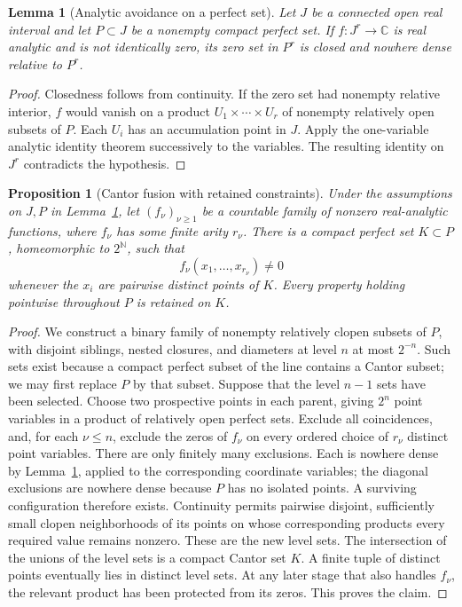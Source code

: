 \documentclass[11pt,a4paper]{article}
\newtheorem{lemma}[theorem]{Lemma}
\newtheorem{proposition}[theorem]{Proposition}
\theoremstyle{definition}
\theoremstyle{remark}
\numberwithin{equation}{section}
\begin{document}
\begin{lemma}[Analytic avoidance on a perfect set]
\label{fol:lem:analytic-avoidance}
Let $J$ be a connected open real interval and let $P\subset J$ be a
nonempty compact perfect set. If $f:J^r\to\mathbb C$ is real analytic
and is not identically zero, its zero set in $P^r$ is closed and nowhere
dense relative to $P^r$.
\end{lemma}
\begin{proof}
Closedness follows from continuity. If the zero set had nonempty
relative interior, $f$ would vanish on a product $U_1\times\cdots\times
U_r$ of nonempty relatively open subsets of $P$. Each $U_i$ has an
accumulation point in $J$. Apply the one-variable analytic identity
theorem successively to the variables. The resulting identity on
$J^r$ contradicts the hypothesis.
\end{proof}

\begin{proposition}[Cantor fusion with retained constraints]
\label{fol:prop:analytic-fusion}
Under the assumptions on $J,P$ in Lemma~\ref{fol:lem:analytic-avoidance},
let $(f_\nu)_{\nu\ge1}$ be a countable family of nonzero real-analytic
functions, where $f_\nu$ has some finite arity $r_\nu$. There is a compact
perfect set $K\subset P$, homeomorphic to $2^{\mathbb N}$, such that
\[
 f_\nu(x_1,\ldots,x_{r_\nu})\ne0
\]
whenever the $x_i$ are pairwise distinct points of $K$.
Every property holding pointwise throughout $P$ is retained on $K$.
\end{proposition}
\begin{proof}
We construct a binary family of nonempty relatively clopen subsets of
$P$, with disjoint siblings, nested closures, and diameters at level $n$
at most $2^{-n}$. Such sets exist because a compact perfect subset of
the line contains a Cantor subset; we may first replace $P$ by that
subset. Suppose that the level $n-1$ sets have been selected. Choose two
prospective points in each parent, giving $2^n$ point variables in a
product of relatively open perfect sets. Exclude all coincidences, and,
for each $\nu\le n$, exclude the zeros of $f_\nu$ on every ordered choice
of $r_\nu$ distinct point variables. There are only finitely many
exclusions. Each is nowhere dense by
Lemma~\ref{fol:lem:analytic-avoidance}, applied to the corresponding
coordinate variables; the diagonal exclusions are nowhere dense because
$P$ has no isolated points. A surviving configuration therefore exists.
Continuity permits pairwise disjoint, sufficiently small clopen
neighborhoods of its points on whose corresponding products every
required value remains nonzero. These are the new level sets.
The intersection of the unions of the level sets is a compact Cantor
set $K$. A finite tuple of distinct points eventually lies in distinct
level sets. At any later stage that also handles $f_\nu$, the relevant
product has been protected from its zeros. This proves the claim.
\end{proof}
\end{document}
